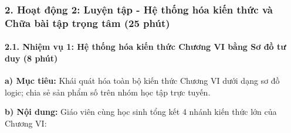 \documentclass[12pt, a4paper]{article}
\begin{document}
\subsubsection*{2. Hoạt động 2: Luyện tập - Hệ thống hóa kiến thức và Chữa bài tập trọng tâm (25 phút)}

\paragraph{2.1. Nhiệm vụ 1: Hệ thống hóa kiến thức Chương VI bằng Sơ đồ tư duy (8 phút)}

\noindent \textbf{a) Mục tiêu:}
Khái quát hóa toàn bộ kiến thức Chương VI dưới dạng sơ đồ logic; chia sẻ sản phẩm số trên nhóm học tập trực tuyến.

\noindent \textbf{b) Nội dung:}
Giáo viên cùng học sinh tổng kết 4 nhánh kiến thức lớn của Chương VI:
\end{document}
